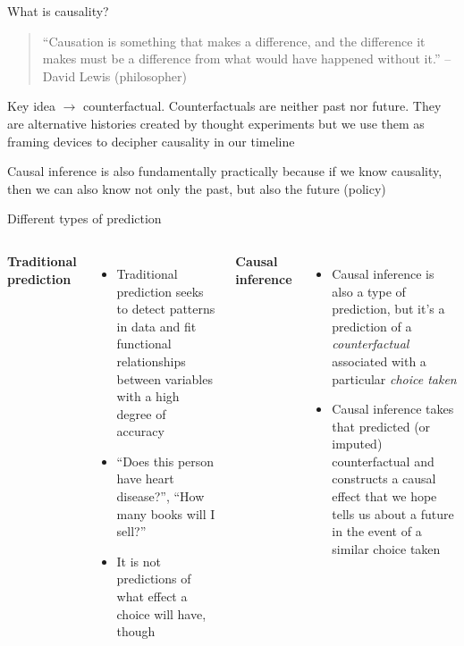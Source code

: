 \documentclass{beamer}
\begin{document}
\begin{frame}{What is causality?}

  \begin{quote}
    ``Causation is something that makes a difference, and the difference it makes must be a difference from what would have happened without it.'' -- David Lewis (philosopher)
  \end{quote}

  \bigskip
  Key idea $\rightarrow$ counterfactual. Counterfactuals are neither past nor future.  They are alternative histories created by thought experiments but we use them as framing devices to decipher causality in our timeline

  \bigskip

  Causal inference is also fundamentally practically because if we know causality, then we can also know not only the past, but also the future (policy)

\end{frame}

\begin{frame}{Different types of prediction}

  \begin{columns}
    \centering
    \textbf{Traditional prediction}
    \begin{itemize}
      \item Traditional prediction seeks to detect patterns in data and fit functional relationships between variables with a high degree of accuracy
      \item ``Does this person have heart disease?'', ``How many books will I sell?''
      \item It is not predictions of what effect a choice will have, though
    \end{itemize}
    \centering
    \textbf{Causal inference}
    \begin{itemize}
      \item Causal inference is also a type of prediction, but it's a prediction of a \emph{counterfactual} associated with a particular \emph{choice taken}
      \item Causal inference takes that predicted (or imputed) counterfactual and constructs a causal effect that we hope tells us about a future in the event of a similar choice taken
    \end{itemize}
  \end{columns}
\end{frame}
\end{document}
